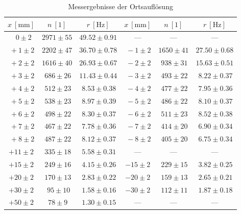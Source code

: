 \documentclass[12pt,a4paper]{scrartcl}
\numberwithin{equation}{section} %
\renewcommand{\[}{} %
\renewcommand{\]}{\noindent} %
\begin{document}
\begin{table}[h]
	\centering
	\begin{tabular}{c|c|c||c|c|c}
		$x\ [\mathrm{mm}]$ & $n\ [1]$ & $r\ [\mathrm{Hz}]$ &
		$x\ [\mathrm{mm}]$ & $n\ [1]$ & $r\ [\mathrm{Hz}]$ \\
		\hline
		$\ \ \ 0 \pm 2$ & $2971 \pm 55$ & $49.52 \pm 0.91$ &---&---&--- \\
		$\ +1 \pm 2$ & $2202 \pm 47$ & $36.70 \pm 0.78$ &
		$\ -1 \pm 2$ & $1650 \pm 41$ & $27.50 \pm 0.68$ \\
		$\ +2 \pm 2$ & $1616 \pm 40$ & $26.93 \pm 0.67$ &
		$\ -2 \pm 2$ & $\ 938 \pm 31$ & $15.63 \pm 0.51$ \\
		$\ +3 \pm 2$ & $\ 686 \pm 26$ & $11.43 \pm 0.44$ &
		$\ -3 \pm 2$ & $\ 493 \pm 22$ & $\ 8.22 \pm 0.37$ \\
		$\ +4 \pm 2$ & $\ 512 \pm 23$ & $\ 8.53 \pm 0.38$ &
		$\ -4 \pm 2$ & $\ 477 \pm 22$ & $\ 7.95 \pm 0.36$ \\
		$\ +5 \pm 2$ & $\ 538 \pm 23$ & $\ 8.97 \pm 0.39$ &
		$\ -5 \pm 2$ & $\ 486 \pm 22$ & $\ 8.10 \pm 0.37$ \\
		$\ +6 \pm 2$ & $\ 498 \pm 22$ & $\ 8.30 \pm 0.37$ &
		$\ -6 \pm 2$ & $\ 511 \pm 23$ & $\ 8.52 \pm 0.38$ \\
		$\ +7 \pm 2$ & $\ 467 \pm 22$ & $\ 7.78 \pm 0.36$ &
		$\ -7 \pm 2$ & $\ 414 \pm 20$ & $\ 6.90 \pm 0.34$ \\
		$\ +8 \pm 2$ & $\ 487 \pm 22$ & $\ 8.12 \pm 0.37$ &
		$\ -8 \pm 2$ & $\ 405 \pm 20$ & $\ 6.75 \pm 0.34$ \\
		$+11 \pm 2$ & $\ 335 \pm 18$ & $\ 5.58 \pm 0.31$ &---&---&---\\
		$+15 \pm 2$ & $\ 249 \pm 16$ & $\ 4.15 \pm 0.26$ &
		$-15 \pm 2$ & $\ 229 \pm 15$ & $\ 3.82 \pm 0.25$ \\
		$+20 \pm 2$ & $\ 170 \pm 13$ & $\ 2.83 \pm 0.22$ &
		$-20 \pm 2$ & $\ 159 \pm 13$ & $\ 2.65 \pm 0.21$ \\
		$+30 \pm 2$ & $\ \ 95 \pm 10$ & $\ 1.58 \pm 0.16$ &
		$-30 \pm 2$ & $\ 112 \pm 11$ & $\ 1.87 \pm 0.18$ \\
		$+50 \pm 2$ & $\ 78 \pm 9$ & $\ 1.30 \pm 0.15$ &---&---&---
	\end{tabular}
	\caption{Messergebnisse der Ortsauflösung}
	\label{tab:Ortsauflösung}
\end{table}
\end{document}
